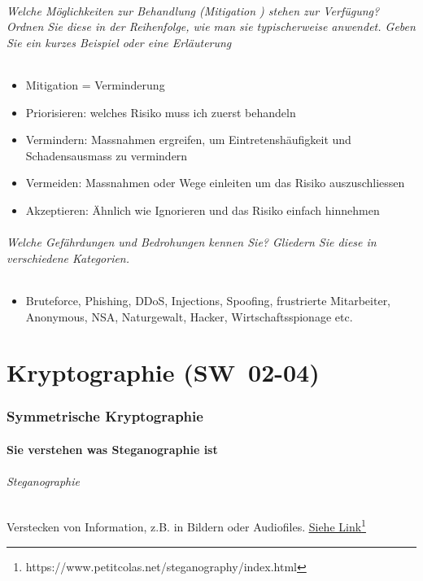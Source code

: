 \documentclass[10pt,a4paper]{article}
\begin{document}
\paragraph*{Welche Möglichkeiten zur Behandlung (\flqq Mitigation \frqq) stehen zur Verfügung? Ordnen Sie diese in der Reihenfolge, wie man sie typischerweise anwendet. Geben Sie ein kurzes Beispiel oder eine Erläuterung}
\begin{itemize}[noitemsep,topsep=0pt,leftmargin=*]
    \item Mitigation = Verminderung
    \item Priorisieren: welches Risiko muss ich zuerst behandeln
    \item Vermindern: Massnahmen ergreifen, um Eintretenshäufigkeit und Schadensausmass zu vermindern
    \item Vermeiden: Massnahmen oder Wege einleiten um das Risiko auszuschliessen
    \item Akzeptieren: Ähnlich wie Ignorieren und das Risiko einfach hinnehmen
\end{itemize}

\paragraph*{Welche Gefährdungen und Bedrohungen kennen Sie? Gliedern Sie diese in verschiedene Kategorien.}
\begin{itemize}[noitemsep,topsep=0pt,leftmargin=*]
    \item Bruteforce, Phishing, DDoS, Injections, Spoofing, frustrierte Mitarbeiter, Anonymous, NSA, Naturgewalt, Hacker, Wirtschaftsspionage etc.
\end{itemize}


\part{Kryptographie (SW~02-04)}
\section{Symmetrische Kryptographie}
\subsection*{Sie verstehen was Steganographie ist}
\paragraph*{Steganographie}Verstecken von Information, z.B. in Bildern oder Audiofiles. \underline{\href{https://www.petitcolas.net/steganography/index.html}{Siehe Link}}\footnote{https://www.petitcolas.net/steganography/index.html}
\end{document}
